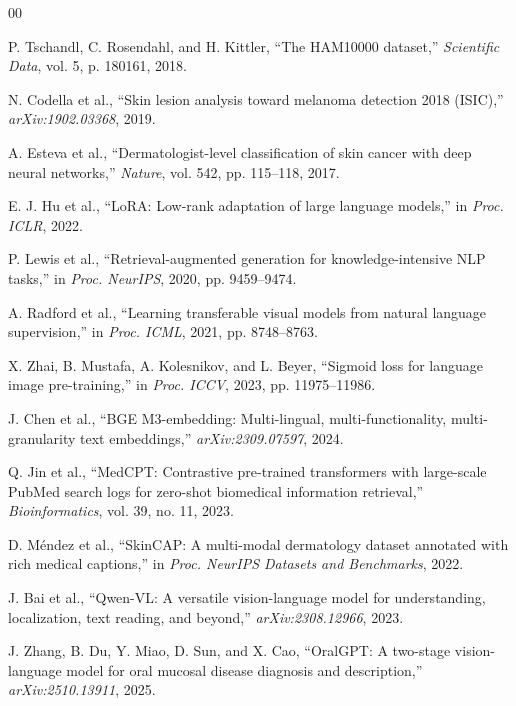 \documentclass[conference,a4paper]{IEEEtran}
\begin{document}
\begin{thebibliography}{00}

P. Tschandl, C. Rosendahl, and H. Kittler,
``The HAM10000 dataset,''
\textit{Scientific Data}, vol. 5, p. 180161, 2018.

N. Codella et al.,
``Skin lesion analysis toward melanoma detection 2018 (ISIC),''
\textit{arXiv:1902.03368}, 2019.

A. Esteva et al.,
``Dermatologist-level classification of skin cancer with deep neural
networks,''
\textit{Nature}, vol. 542, pp. 115--118, 2017.

E. J. Hu et al.,
``LoRA: Low-rank adaptation of large language models,''
in \textit{Proc. ICLR}, 2022.

P. Lewis et al.,
``Retrieval-augmented generation for knowledge-intensive NLP tasks,''
in \textit{Proc. NeurIPS}, 2020, pp. 9459--9474.

A. Radford et al.,
``Learning transferable visual models from natural language supervision,''
in \textit{Proc. ICML}, 2021, pp. 8748--8763.

X. Zhai, B. Mustafa, A. Kolesnikov, and L. Beyer,
``Sigmoid loss for language image pre-training,''
in \textit{Proc. ICCV}, 2023, pp. 11975--11986.

J. Chen et al.,
``BGE M3-embedding: Multi-lingual, multi-functionality,
multi-granularity text embeddings,''
\textit{arXiv:2309.07597}, 2024.

Q. Jin et al.,
``MedCPT: Contrastive pre-trained transformers with large-scale PubMed
search logs for zero-shot biomedical information retrieval,''
\textit{Bioinformatics}, vol. 39, no. 11, 2023.

D. M\'{e}ndez et al.,
``SkinCAP: A multi-modal dermatology dataset annotated with rich medical
captions,''
in \textit{Proc. NeurIPS Datasets and Benchmarks}, 2022.

J. Bai et al.,
``Qwen-VL: A versatile vision-language model for understanding,
localization, text reading, and beyond,''
\textit{arXiv:2308.12966}, 2023.

J. Zhang, B. Du, Y. Miao, D. Sun, and X. Cao,
``OralGPT: A two-stage vision-language model for oral mucosal disease
diagnosis and description,''
\textit{arXiv:2510.13911}, 2025.

\end{thebibliography}
\end{document}

